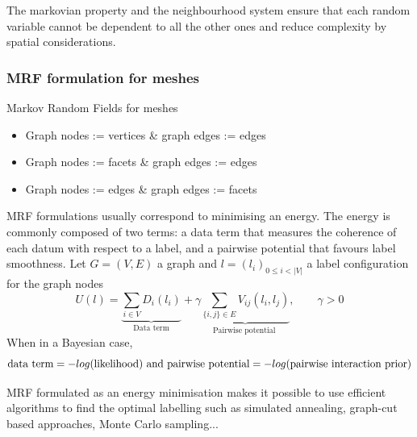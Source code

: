 \documentclass{kththesis}
\begin{document}
 The markovian property and the neighbourhood system ensure that each random variable cannot be dependent to all the
other ones and reduce complexity  by spatial  considerations.
\subsubsection{MRF formulation for meshes}
Markov Random Fields for meshes
\begin{itemize}
    \item Graph nodes := vertices \& graph edges := edges
    \item Graph nodes := facets \& graph edges := edges
    \item Graph nodes := edges \& graph edges := facets
\end{itemize}

MRF formulations usually correspond to minimising an energy. The energy is commonly composed of two terms: a data term that measures the coherence of each datum with respect to a label, and a pairwise potential that favours label smoothness.
Let $G=(V,E)$ a graph and $l=(l_i)_{0\leq i < |V|} $ a label configuration for the graph nodes \\
\[ U(l)=
\underbrace{ \sum \limits_{i\in V} D_i(l_i)}_{\text{Data term} } + \gamma \underbrace{ \sum \limits_{\{i,j\} \in E} V_{ij}(l_i, l_j)}_{\text{Pairwise potential }} , \qquad \gamma>0
\]
When in a Bayesian case, $$\text{data term}=-log(\text{likelihood}) \\ \text{ and pairwise potential}=-log(\text{pairwise interaction prior})$$


MRF formulated as an energy minimisation makes it possible to use efficient algorithms to find the optimal labelling such as simulated annealing, graph-cut based approaches, Monte Carlo sampling... 
\end{document}
